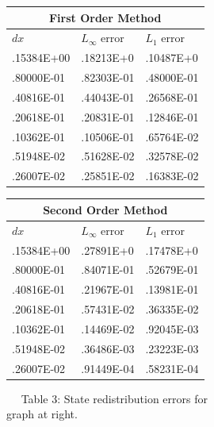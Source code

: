 \hspace*{-.6in}
\begin{minipage}[c][4.5in][t]{3in}
{\small
\vspace*{-.5in}
\begin{tabular}{|l|l|l|}\hline
\multicolumn{3}{|c|}{First Order Method} \\ \hline
$dx$ & $L_{\infty}$ error & $L_1$ error \\
 .15384E+00 &  .18213E+0  &  .10487E+0 \\
 .80000E-01 &  .82303E-01 &  .48000E-01 \\
 .40816E-01 &  .44043E-01 &  .26568E-01  \\
 .20618E-01 &  .20831E-01 &  .12846E-01 \\
 .10362E-01 &  .10506E-01 &  .65764E-02 \\
 .51948E-02 &  .51628E-02 &  .32578E-02 \\
 .26007E-02 &  .25851E-02 &  .16383E-02 \\
\hline \hline
\end{tabular}
\vspace*{.2in}
\begin{tabular}{|l|l|l|}\hline
\multicolumn{3}{|c|}{Second Order Method} \\ \hline
$dx$ & $L_{\infty}$ error & $L_1$ error \\
 .15384E+00 &  .27891E+0  & .17478E+0 \\
 .80000E-01 &  .84071E-01 & .52679E-01 \\
 .40816E-01 &  .21967E-01 & .13981E-01 \\
 .20618E-01 &  .57431E-02 & .36335E-02 \\
 .10362E-01 &  .14469E-02 & .92045E-03 \\
 .51948E-02 &  .36486E-03 & .23223E-03 \\
 .26007E-02 &  .91449E-04 & .58231E-04 \\
\hline \hline
\end{tabular}
}
$\quad$ Table 3: {\sf  State redistribution errors for \\
graph at right.  }
\end{minipage}
\hspace*{.1in}
\vspace*{.1in}
